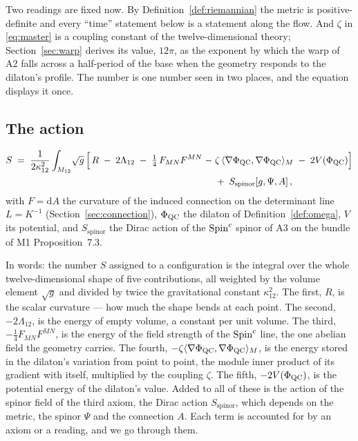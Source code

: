 Two readings are fixed now. By Definition~\ref{def:riemannian} the metric
is positive-definite and every ``time'' statement below is a statement
along the flow. And $\zeta$ in \eqref{eq:master} is a coupling constant of
the twelve-dimensional theory; Section~\ref{sec:warp} derives its value, $12\pi$, as the
exponent by which the warp of A2 falls across a half-period of the base
when the geometry responds to the dilaton's profile. The number is one
number seen in two places, and the equation displays it once.

\subsection{The action}\label{sec:action}

\begin{definition}\label{def:action}
\begin{equation}\label{eq:action}
\begin{aligned}
  S\;=\;\frac{1}{2\kappa_{12}^{2}}\int_{M_{12}}\!\sqrt{g}\,
  \Bigl[\,R\;-\;2\Lambda_{12}\;-\;\tfrac14\,F_{MN}F^{MN}
  \;-\;&\zeta\,\langle\nabla\Phi_{\mathrm{QC}},\nabla\Phi_{\mathrm{QC}}\rangle_{M}\;-\;2V(\Phi_{\mathrm{QC}})\Bigr]\\
  &+\;S_{\mathrm{spinor}}[g,\Psi,A]\,,
\end{aligned}
\end{equation}
with $F=\mathrm{d}A$ the curvature of the induced connection on the
determinant line $L=K^{-1}$ (Section~\ref{sec:connection}), $\Phi_{\mathrm{QC}}$ the
dilaton of Definition~\ref{def:omega}, $V$ its potential, and
$S_{\mathrm{spinor}}$ the Dirac action of the $\text{Spin}^c$ spinor of A3 on the
bundle of M1 Proposition~7.3.
\end{definition}

In words: the number $S$ assigned to a configuration is the integral over
the whole twelve-dimensional shape of five contributions, all weighted by
the volume element $\sqrt{g}$ and divided by twice the gravitational
constant $\kappa_{12}^{2}$. The first, $R$, is the scalar curvature --- how
much the shape bends at each point. The second, $-2\Lambda_{12}$, is the
energy of empty volume, a constant per unit volume. The third,
$-\tfrac14F_{MN}F^{MN}$, is the energy of the field strength of the
$\text{Spin}^c$ line, the one abelian field the geometry carries. The fourth,
$-\zeta\langle\nabla\Phi_{\mathrm{QC}},\nabla\Phi_{\mathrm{QC}}\rangle_{M}$, is the energy stored in the
dilaton's variation from point to point, the module inner product of its
gradient with itself, multiplied by the coupling $\zeta$. The fifth,
$-2V(\Phi_{\mathrm{QC}})$, is the potential energy of the dilaton's value. Added to all
of these is the action of the spinor field of the third axiom, the Dirac
action $S_{\mathrm{spinor}}$, which depends on the metric, the spinor
$\Psi$ and the connection $A$. Each term is accounted for by an axiom or a
reading, and we go through them.

